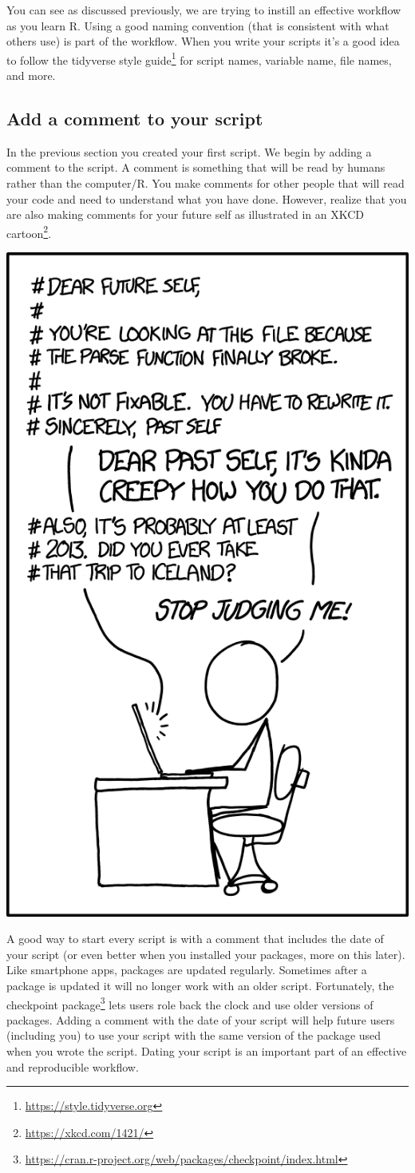 \documentclass[
]{krantz}
\renewcommand{\href}[2]{#2\footnote{\url{#1}}}
\begin{document}
You can see as discussed previously, we are trying to instill an effective workflow as you learn R. Using a good naming convention (that is consistent with what others use) is part of the workflow. When you write your scripts it's a good idea to follow the \href{https://style.tidyverse.org}{tidyverse style guide} for script names, variable name, file names, and more.

\hypertarget{add-a-comment-to-your-script}{%
\subsection{Add a comment to your script}\label{add-a-comment-to-your-script}}

In the previous section you created your first script. We begin by adding a comment to the script. A comment is something that will be read by humans rather than the computer/R. You make comments for other people that will read your code and need to understand what you have done. However, realize that you are also making comments for your future self as illustrated in an \href{https://xkcd.com/1421/}{XKCD cartoon}.

\includegraphics[width=0.4\linewidth]{ch_introduction/images/future_self_2x}

A good way to start every script is with a comment that includes the date of your script (or even better when you installed your packages, more on this later). Like smartphone apps, packages are updated regularly. Sometimes after a package is updated it will no longer work with an older script. Fortunately, the \href{https://cran.r-project.org/web/packages/checkpoint/index.html}{checkpoint package} lets users role back the clock and use older versions of packages. Adding a comment with the date of your script will help future users (including you) to use your script with the same version of the package used when you wrote the script. Dating your script is an important part of an effective and reproducible workflow.
\end{document}
